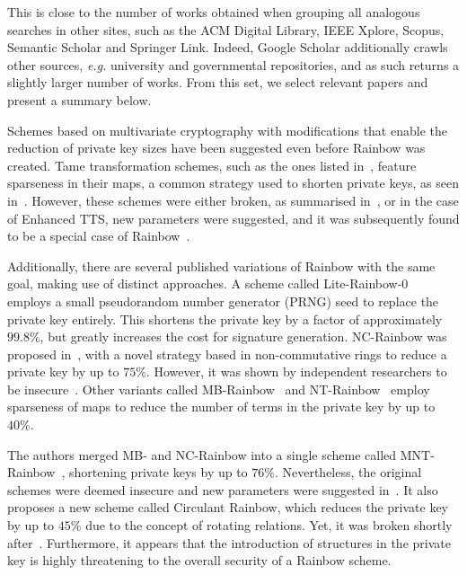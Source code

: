 \documentclass[openright]{report}
\begin{document}
This is close to the number of works obtained when grouping all analogous searches in other sites, such as the ACM Digital Library, IEEE Xplore, Scopus, Semantic Scholar and Springer Link. Indeed, Google Scholar additionally crawls other sources, \emph{e.g.} university and governmental repositories, and as such returns a slightly larger number of works. From this set, we select relevant papers and present a summary below.

Schemes based on multivariate cryptography with modifications that enable the
reduction of private key sizes have been suggested even before Rainbow was
created. Tame transformation schemes, such as the ones listed
in~\cite{Wolf:200503:misc}, feature sparseness in their maps, a common
strategy used to shorten private keys, as seen in~\cite{Yang:200604:inproc}.
However, these schemes were either broken, as summarised
in~\cite{Ding:200604:article}, or in the case of Enhanced TTS, new parameters
were suggested, and it was subsequently found to be a special case of
Rainbow~\cite{Thomae:201207:inproc}.

Additionally, there are several published variations of Rainbow with the
same goal, making use of distinct approaches. A scheme called
Lite-Rainbow-0~\cite{Shim:201512:inproc} employs a small pseudorandom
number generator (PRNG) seed to replace the private key entirely. This shortens
the private key by a factor of approximately $99.8\%$, but greatly increases
the cost for signature generation. NC-Rainbow was proposed
in~\cite{Yasuda:201202:inproc}, with a novel strategy based in non-commutative
rings to reduce a private key by up to $75\%$. However, it was shown by
independent researchers to be
insecure~\cite{Thomae:201209:inproc,Hashimoto:201302:inproc}. Other variants
called MB-Rainbow~\cite{Yasuda:201305:inproc} and
NT-Rainbow~\cite{Yasuda:201404:inproc} employ sparseness of maps to reduce the
number of terms in the private key by up to $40\%$.

The authors merged MB- and NC-Rainbow into a single scheme called
MNT-Rainbow~\cite{Yasuda:201409:article}, shortening private keys by up to
$76\%$. Nevertheless, the original schemes were deemed insecure and new
parameters were suggested in~\cite{Peng:201706:article}. It also proposes a new
scheme called Circulant Rainbow, which reduces the private key by up to $45\%$
due to the concept of rotating relations. Yet, it was broken shortly
after~\cite{Hashimoto:201810:misc}. Furthermore, it appears that the introduction
of structures in the private key is highly threatening to the overall security 
of a Rainbow scheme.
\end{document}

